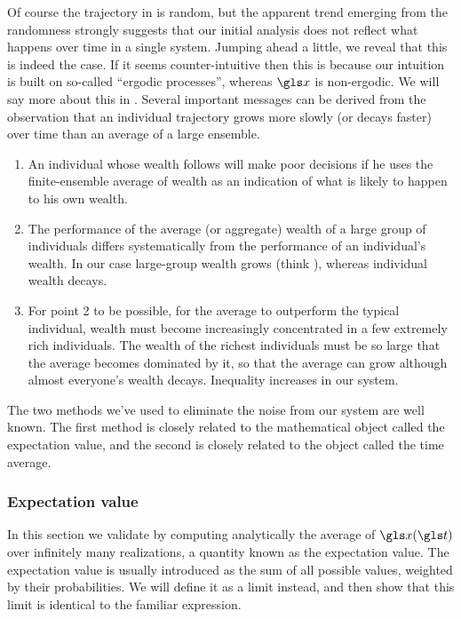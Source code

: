 Of course the trajectory in  is random, but the apparent trend emerging from the randomness 
strongly suggests that our initial analysis does not reflect what happens over time in a single system. 
Jumping ahead a little, we reveal that this is indeed the case. If it seems counter-intuitive then this is 
because our intuition is built on so-called ``ergodic processes'', whereas $\x$ is non-ergodic. We will say
more about this in .
Several important messages can be derived from the observation that an individual trajectory grows 
more slowly (or decays faster) over time than an average of a large ensemble. 

\begin{enumerate}
\item
An individual whose wealth follows  will make poor decisions if he uses the 
finite-ensemble average of wealth as an indication of what is likely to happen to his own wealth.
\item
The performance of the average (or aggregate) wealth of a large group of individuals differs systematically from 
the performance of an individual's wealth. In our case large-group wealth grows (think \GDP), whereas 
individual wealth decays.
\item
For point 2 to be possible, \ie for the average to outperform the typical individual, wealth must 
become increasingly concentrated in a 
few extremely rich individuals. The wealth of the richest individuals must be so large that the average becomes 
dominated by it, so that the average can grow although almost everyone's wealth decays. Inequality 
increases in our system.
\end{enumerate}

The two methods we've used to eliminate the noise from our system
are well known. The first method is closely related to the mathematical object called the
expectation value, and the second is closely related to the object called the time average.

\subsubsection{Expectation value}
In this section we validate  by computing analytically the
average of $\x(\t)$ over infinitely many realizations, a quantity known as the expectation value.
The expectation value is usually introduced as the sum of all possible values, 
weighted by their probabilities. We will define it as a limit instead, and then
show that this limit is identical to the familiar expression.

